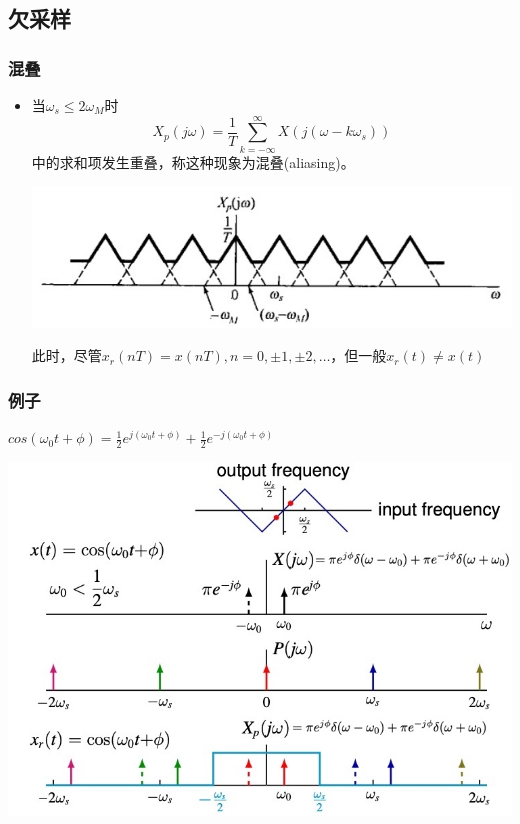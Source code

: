\documentclass[CJKutf8,xcolor=pdftex,dvipsnames,table]{beamer}
\begin{document}
\begin{CJK*}{UTF8}{song}
	\section{欠采样}
	
  \begin{frame}
    \frametitle{混叠}
    \begin{itemize}
    \item 当$\omega_s \leq 2\omega_M$时
    \[
    	X_p(j\omega)=\frac{1}{T}\sum_{k=-\infty}^{\infty} X(j(\omega-k\omega_s))
    \]
    中的求和项发生重叠，称这种现象为混叠(aliasing)。
    \begin{center}
      \includegraphics[scale=.5]{ss-c-f7-3d}
    \end{center}
    此时，尽管$x_r(nT)=x(nT), n=0, \pm1, \pm2, \hdots$，但一般$x_r(t) \neq x(t)$
    \end{itemize}
  \end{frame} 
  
  \begin{frame}
    \frametitle{例子}
	$cos(\omega_0 t + \phi) = \frac{1}{2}e^{j(\omega_0 t+ \phi)}+\frac{1}{2}e^{-j(\omega_0 t+ \phi)}	$

    \begin{center}
    \includegraphics[scale=.42]{aliasing-example-1}
    \end{center}


\end{frame}
\end{CJK*}
\end{document}
